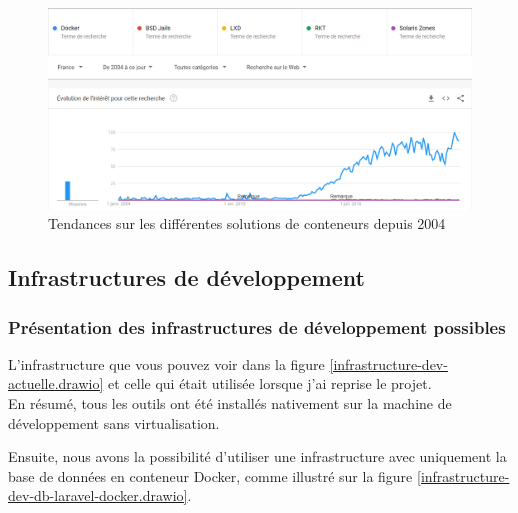 \documentclass[
    iai, %
    il, %
]{heig-tb}
\begin{document}
\begin{center}
    \begin{figure}
        \includegraphics[width=\textwidth]{./assets/figures/google-trend-containers-2022.png}
        \caption[Tendances solutions de conteneurs]{Tendances sur les différentes solutions de conteneurs depuis 2004} \label{containers-trends}
    \end{figure}
\end{center}

\subsection{Infrastructures de développement}

\subsubsection{Présentation des infrastructures de développement possibles}


L'infrastructure que vous pouvez voir dans la figure \ref{infrastructure-dev-actuelle.drawio} et celle qui était utilisée lorsque j'ai reprise le projet.\\
En résumé, tous les outils ont été installés nativement sur la machine de développement sans virtualisation.

Ensuite, nous avons la possibilité d'utiliser une infrastructure avec uniquement la base de données
en conteneur Docker, comme illustré sur la figure \ref{infrastructure-dev-db-laravel-docker.drawio}.
\end{document}
